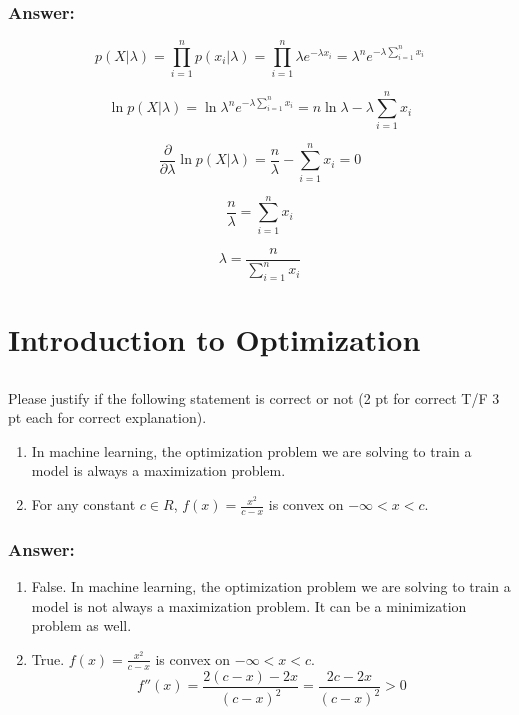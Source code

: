 \documentclass{article}
\begin{document}
\subsubsection{Answer:}
\begin{equation}
    p(X | \lambda) = \prod_{i=1}^{n} p(x_i | \lambda) = \prod_{i=1}^{n} \lambda e^{-\lambda x_i} = \lambda^n e^{-\lambda \sum_{i=1}^{n} x_i}
\end{equation}

\begin{equation}
    \ln p(X | \lambda) = \ln \lambda^n e^{-\lambda \sum_{i=1}^{n} x_i} = n \ln \lambda - \lambda \sum_{i=1}^{n} x_i
\end{equation}

\begin{equation}
    \frac{\partial}{\partial \lambda} \ln p(X | \lambda) = \frac{n}{\lambda} - \sum_{i=1}^{n} x_i = 0
\end{equation}

\begin{equation}
    \frac{n}{\lambda} = \sum_{i=1}^{n} x_i
\end{equation}

\begin{equation}
    \lambda = \frac{n}{\sum_{i=1}^{n} x_i}
\end{equation}

\section{Introduction to Optimization}

\subsection{}
Please justify if the following statement is correct or not (2 pt for correct T/F 3 pt each for correct explanation).
\begin{enumerate}[label= (\alph*)]
    \item In machine learning, the optimization problem we are solving to train a model is always a maximization problem.
    \item For any constant $c \in R$, $f(x) = \frac{x^2}{c-x}$ is convex on $-\infty < x < c$.
\end{enumerate}

\subsubsection{Answer:}
\begin{enumerate}[label= (\alph*)]
    \item False. In machine learning, the optimization problem we are solving to train a model is not always a maximization problem. It can be a minimization problem as well.
    \item True. $f(x) = \frac{x^2}{c-x}$ is convex on $-\infty < x < c$.
    \begin{equation}
        f''(x) = \frac{2(c-x) - 2x}{{(c-x)}^2} = \frac{2c - 2x}{{(c-x)}^2} > 0
    \end{equation}
\end{enumerate}
\end{document}
